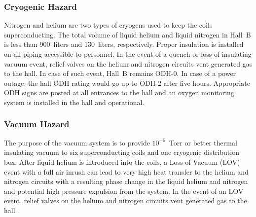 \subsubsection{Cryogenic Hazard}

Nitrogen and helium are two types of cryogens used to keep the coils superconducting. The 
total volume of liquid helium and liquid nitrogen in Hall~B is less than 900~liters and 
130~liters, respectively. Proper insulation is installed on all piping accessible to 
personnel. In the event of a quench or loss of insulating vacuum event, relief valves on 
the helium and nitrogen circuits vent generated gas to the hall. In case of such event, 
Hall~B remains ODH-0. In case of a power outage, the hall ODH rating would go up to ODH-2 
after five hours. Appropriate ODH signs are posted at all entrances to the hall and an 
oxygen monitoring system is installed in the hall and operational.

\subsubsection{Vacuum Hazard}

The purpose of the vacuum system is to provide $10^{-5}$~Torr or better thermal insulating 
vacuum to six superconducting coils and one cryogenic distribution box. After liquid helium 
is introduced into the coils, a Loss of Vacuum (LOV) event with a full air inrush can lead to
very high heat transfer to the helium and nitrogen circuits with a resulting phase change in 
the liquid helium and nitrogen and potential high pressure expulsion from the system. In the 
event of an LOV event, relief valves on the helium and nitrogen circuits vent generated
gas to the hall.


